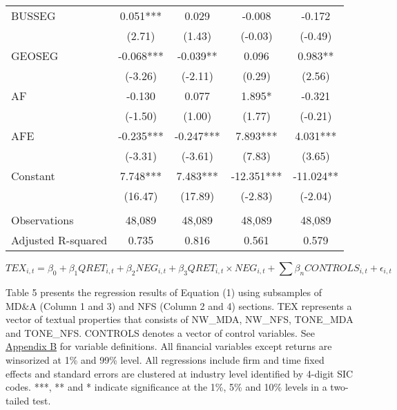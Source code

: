 \begin{table}[H]
\begin{center}
\begin{tabular}{lcccc}
			BUSSEG & 0.051*** & 0.029 & -0.008 & -0.172 \\
			& (2.71) & (1.43) & (-0.03) & (-0.49) \\
			GEOSEG & -0.068*** & -0.039** & 0.096 & 0.983** \\
			& (-3.26) & (-2.11) & (0.29) & (2.56) \\
			AF & -0.130 & 0.077 & 1.895* & -0.321 \\
			& (-1.50) & (1.00) & (1.77) & (-0.21) \\
			AFE & -0.235*** & -0.247*** & 7.893*** & 4.031*** \\
			& (-3.31) & (-3.61) & (7.83) & (3.65) \\
			Constant & 7.748*** & 7.483*** & -12.351*** & -11.024** \\
			& (16.47) & (17.89) & (-2.83) & (-2.04) \\
			&   &   &   &  \\
			Observations & 48,089 & 48,089 & 48,089 & 48,089 \\
			Adjusted R-squared & 0.735 & 0.816 & 0.561 & 0.579 \\
			\bottomrule
			\bottomrule
		\end{tabular}%
	\end{center}
\begin{footnotesize}
	\setcounter{equation}{0}
	\begin{equation}
		TEX_{i,t}=\beta_0+\beta_1QRET_{i,t}+\beta_2NEG_{i,t}+\beta_3QRET_{i,t}\times NEG_{i,t}+\sum\beta_nCONTROLS_{i,t}+\epsilon_{i,t}
	\end{equation}
	
	\noindent Table 5 presents the regression results of Equation (1) using subsamples of MD\&A (Column 1 and 3) and NFS (Column 2 and 4) sections. TEX represents a vector of textual properties that consists of NW\_MDA, NW\_NFS, TONE\_MDA and TONE\_NFS. CONTROLS denotes a vector of control variables. See \hyperref[appb]{Appendix B} for variable definitions. All financial variables except returns are winsorized at 1\% and 99\% level. All regressions include firm and time fixed effects and standard errors are clustered at industry level identified by 4-digit SIC codes. ***, ** and * indicate significance at the 1\%, 5\% and 10\% levels in a two-tailed test.
\end{footnotesize}
\end{table}%